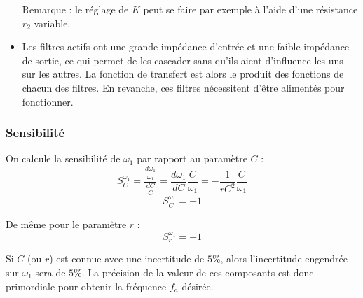 \documentclass[../../Cours_M1.tex]{subfiles}
\begin{document}
\begin{itemize}
Remarque : le réglage de $K$ peut se faire par exemple à l'aide d'une résistance $r_2$ variable.

\item Les filtres actifs ont une grande impédance d'entrée et une faible impédance de sortie, ce qui permet de les cascader sans qu'ils aient d'influence les uns sur les autres. La fonction de transfert est alors le produit des fonctions de chacun des filtres.
En revanche, ces filtres nécessitent d'être alimentés pour fonctionner.
\end{itemize}

\subsubsection*{Sensibilité}
On calcule la sensibilité de $\omega_1$ par rapport au paramètre $C$ :
\[S_C^{\omega_1} = \frac{\frac{d\omega_1}{\omega_1}}{\frac{dC}{C}} = \frac{d\omega_1}{dC}\frac{C}{\omega_1} = -\frac{1}{rC^2}\frac{C}{\omega_ 1} \]
\[ S_C^{\omega_1}= - 1 \]

De même pour le paramètre $r$ :
\[ S_r^{\omega_1} = -1 \]

Si $C$ (ou $r$) est connue avec une incertitude de $5\%$, alors l'incertitude engendrée sur $\omega_1$ sera de $5\%$. La précision de la valeur de ces composants est donc primordiale pour obtenir la fréquence $f_a$ désirée.
\end{document}
